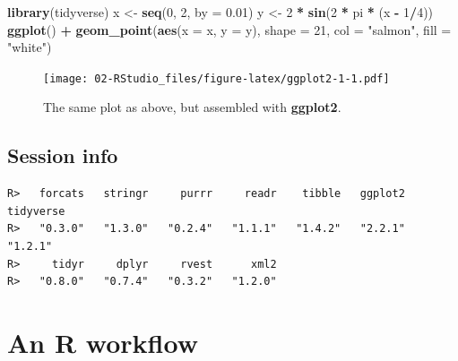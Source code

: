 \documentclass[]{book}
\newenvironment{Shaded}{\begin{snugshade}}{\end{snugshade}}
\newcommand{\KeywordTok}[1]{\textcolor[rgb]{0.13,0.29,0.53}{\textbf{#1}}}
\newcommand{\DataTypeTok}[1]{\textcolor[rgb]{0.13,0.29,0.53}{#1}}
\newcommand{\DecValTok}[1]{\textcolor[rgb]{0.00,0.00,0.81}{#1}}
\newcommand{\FloatTok}[1]{\textcolor[rgb]{0.00,0.00,0.81}{#1}}
\newcommand{\StringTok}[1]{\textcolor[rgb]{0.31,0.60,0.02}{#1}}
\newcommand{\OperatorTok}[1]{\textcolor[rgb]{0.81,0.36,0.00}{\textbf{#1}}}
\newcommand{\NormalTok}[1]{#1}
\theoremstyle{definition}
\theoremstyle{definition}
\theoremstyle{definition}
\theoremstyle{remark}
\begin{document}
\begin{Shaded}
\begin{Highlighting}[]
\KeywordTok{library}\NormalTok{(tidyverse)}
\NormalTok{x <-}\StringTok{ }\KeywordTok{seq}\NormalTok{(}\DecValTok{0}\NormalTok{, }\DecValTok{2}\NormalTok{, }\DataTypeTok{by =} \FloatTok{0.01}\NormalTok{)}
\NormalTok{y <-}\StringTok{ }\DecValTok{2} \OperatorTok{*}\StringTok{ }\KeywordTok{sin}\NormalTok{(}\DecValTok{2} \OperatorTok{*}\StringTok{ }\NormalTok{pi }\OperatorTok{*}\StringTok{ }\NormalTok{(x }\OperatorTok{-}\StringTok{ }\DecValTok{1}\OperatorTok{/}\DecValTok{4}\NormalTok{))}
\KeywordTok{ggplot}\NormalTok{() }\OperatorTok{+}
\StringTok{  }\KeywordTok{geom_point}\NormalTok{(}\KeywordTok{aes}\NormalTok{(}\DataTypeTok{x =}\NormalTok{ x, }\DataTypeTok{y =}\NormalTok{ y), }\DataTypeTok{shape =} \DecValTok{21}\NormalTok{, }\DataTypeTok{col =} \StringTok{"salmon"}\NormalTok{, }\DataTypeTok{fill =} \StringTok{"white"}\NormalTok{)}
\end{Highlighting}
\end{Shaded}

\begin{figure}
\centering
\texttt{[image: 02-RStudio\_files/figure-latex/ggplot2-1-1.pdf]}
\caption{\label{fig:ggplot2-1}The same plot as above, but assembled with
\textbf{ggplot2}.}
\end{figure}

\section{Session info}\label{session-info-1}

\begin{Shaded}
\end{Shaded}

\begin{verbatim}
R>   forcats   stringr     purrr     readr    tibble   ggplot2 tidyverse 
R>   "0.3.0"   "1.3.0"   "0.2.4"   "1.1.1"   "1.4.2"   "2.2.1"   "1.2.1" 
R>     tidyr     dplyr     rvest      xml2 
R>   "0.8.0"   "0.7.4"   "0.3.2"   "1.2.0"
\end{verbatim}

\chapter{An R workflow}\label{workflow}
\end{document}
